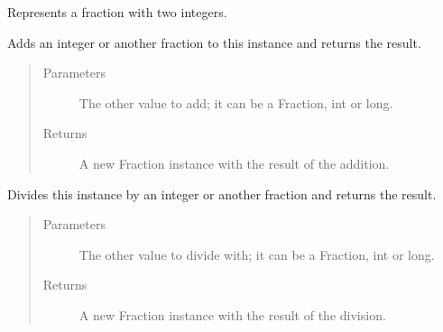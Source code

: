 \documentclass[letterpaper,10pt,english]{sphinxhowto}
\begin{document}
\begin{fulllineitems}
\label{\detokenize{fraction:fraction.Fraction}}
Represents a fraction with two integers.

\begin{fulllineitems}
\label{\detokenize{fraction:fraction.Fraction.__add__}}
Adds an integer or another fraction to this instance and returns the result.
\begin{quote}\begin{description}
\item[{Parameters}] \leavevmode
{} \textendash{} The other value to add; it can be a Fraction, int or long.

\item[{Returns}] \leavevmode
A new Fraction instance with the result of the addition.

\end{description}\end{quote}

\end{fulllineitems}


\begin{fulllineitems}
\label{\detokenize{fraction:fraction.Fraction.__div__}}
Divides this instance by an integer or another fraction and returns the result.
\begin{quote}\begin{description}
\item[{Parameters}] \leavevmode
{} \textendash{} The other value to divide with; it can be a Fraction, int or long.

\item[{Returns}] \leavevmode
A new Fraction instance with the result of the division.

\end{description}\end{quote}

\end{fulllineitems}



\end{fulllineitems}
\end{document}
